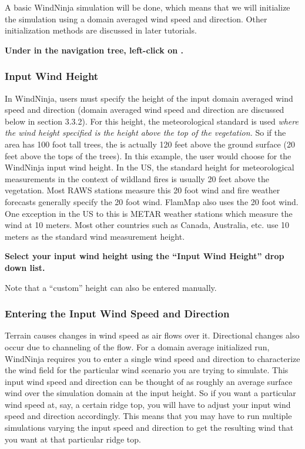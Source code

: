 \documentclass[12pt]{article}
\begin{document}
A basic WindNinja simulation will be done, which means that we will initialize the simulation using a domain averaged wind speed and direction.  
Other initialization methods are discussed in later tutorials.

\textbf{\color{red} Under  in the navigation tree, left-click on .}

\subsubsection{Input Wind Height}

In WindNinja, users must specify the height of the input domain averaged wind speed and direction (domain averaged wind speed and direction are discussed below in section 3.3.2).  
For this height, the meteorological standard is used \textit{where the wind height specified is the height above the top of the vegetation.}  So if the area has 100 foot tall trees, the  is actually 120 feet above the ground surface (20 feet above the tops of the trees).  
In this example, the user would choose  for the WindNinja input wind height.  
In the US, the standard height for meteorological measurements in the context of wildland fires is usually 20 feet above the vegetation.  
Most RAWS stations measure this 20 foot wind and fire weather forecasts generally specify the 20 foot wind. FlamMap also uses the 20 foot wind.  
One exception in the US to this is METAR weather stations which measure the wind at 10 meters.  
Most other countries such as Canada, Australia, etc. use 10 meters as the standard wind measurement height.

\textbf{\color{red} Select your input wind height using the “Input Wind Height” drop down list.}

Note that a “custom” height can also be entered manually.

\subsubsection{Entering the Input Wind Speed and Direction}

Terrain causes changes in wind speed as air flows over it.  Directional changes also occur due to channeling of the flow.  
For a  domain average initialized run, WindNinja requires you to enter a single wind speed and direction to characterize the wind field for the particular wind scenario you are trying to simulate.  
This input wind speed and direction can be thought of as roughly an average surface wind over the simulation domain at the input height.  
So if you want a particular wind speed at, say, a certain ridge top, you will have to adjust your input wind speed and direction accordingly.  
This means that you may have to run multiple simulations varying the input speed and direction to get the resulting wind that you want at that particular ridge top.
\end{document}
